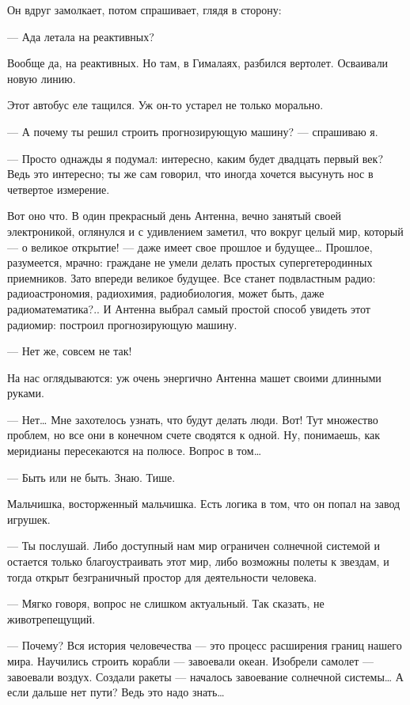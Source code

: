    Он вдруг замолкает, потом спрашивает, глядя в сторону:

   — Ада летала на реактивных?

   Вообще да, на реактивных. Но там, в Гималаях, разбился вертолет. Осваивали
   новую линию.

   Этот автобус еле тащился. Уж он-то устарел не только морально.

   — А почему ты решил строить прогнозирующую машину? — спрашиваю я.

   — Просто однажды я  подумал: интересно, каким  будет двадцать первый  век?
   Ведь это интересно; ты же сам  говорил, что иногда хочется высунуть нос  в
   четвертое измерение.

   Вот  оно  что.  В  один  прекрасный  день  Антенна,  вечно  занятый  своей
   электроникой, оглянулся  и с  удивлением заметил,  что вокруг  целый  мир,
   который —  о  великое открытие!  —  даже  имеет свое  прошлое  и  будущее…
   Прошлое,  разумеется,   мрачно:   граждане   не   умели   делать   простых
   супергетеродинных приемников.  Зато впереди  великое будущее.  Все  станет
   подвластным радио: радиоастрономия, радиохимия, радиобиология, может быть,
   даже радиоматематика?.. И Антенна выбрал самый простой способ увидеть этот
   радиомир: построил прогнозирующую машину.

   — Нет же, совсем не так!

   На нас  оглядываются: уж  очень энергично  Антенна машет  своими  длинными
   руками.

   — Нет… Мне захотелось  узнать, что будут делать  люди. Вот! Тут  множество
   проблем, но все они в конечном счете сводятся к одной. Ну, понимаешь,  как
   меридианы пересекаются на полюсе. Вопрос в том…

   — Быть или не быть. Знаю. Тише.

   Мальчишка, восторженный  мальчишка. Есть  логика в  том, что  он попал  на
   завод игрушек.

   — Ты  послушай. Либо  доступный  нам мир  ограничен солнечной  системой  и
   остается только благоустраивать этот мир, либо возможны полеты к  звездам,
   и тогда открыт безграничный простор для деятельности человека.

   —  Мягко  говоря,   вопрос  не   слишком  актуальный.   Так  сказать,   не
   животрепещущий.

   — Почему? Вся история человечества — это процесс расширения границ  нашего
   мира. Научились  строить корабли  — завоевали  океан. Изобрели  самолет  —
   завоевали воздух. Создали ракеты — началось завоевание солнечной  системы…
   А если дальше нет пути? Ведь это надо знать…

